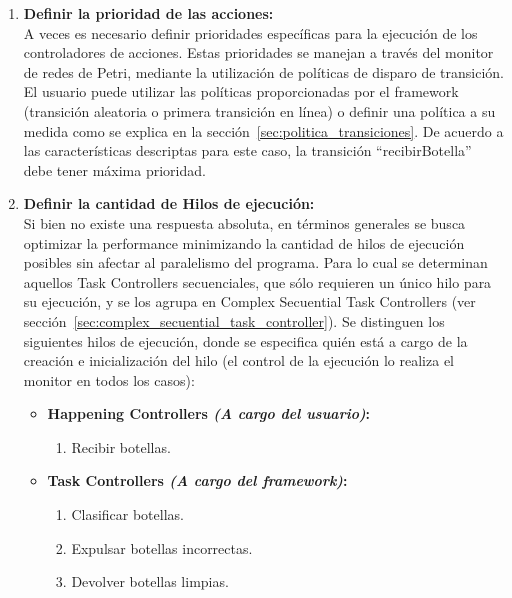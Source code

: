 \begin{enumerate}
\item \textbf{Definir la prioridad de las acciones:}\\
            A veces es necesario definir prioridades específicas para la ejecución de los
            controladores de acciones. Estas prioridades se manejan a través del monitor
            de redes de Petri, mediante la utilización de políticas de disparo de
            transición. El usuario puede utilizar las políticas proporcionadas por el
            framework (transición aleatoria o primera transición en línea) o definir una
            política a su medida como se explica en la sección~\ref{sec:politica_transiciones}.
            De acuerdo a las características descriptas para este caso, la transición
            ``recibirBotella'' debe tener máxima prioridad.

\item \textbf{Definir la cantidad de Hilos de ejecución:}\\
            Si bien no existe una respuesta absoluta, en términos generales se busca
            optimizar la performance minimizando la cantidad de hilos de ejecución
            posibles sin afectar al paralelismo del programa. Para lo cual se determinan
            aquellos Task Controllers secuenciales, que sólo requieren un único hilo para
            su ejecución, y se los agrupa en Complex Secuential Task Controllers (ver
            sección~\ref{sec:complex_secuential_task_controller}).
            Se distinguen los siguientes hilos de ejecución, donde se especifica quién
            está a cargo de la creación e inicialización del hilo (el control de la
            ejecución lo realiza el monitor en todos los casos):
            \begin{itemize}
              \item \textbf{Happening Controllers \emph{(A cargo del usuario)}:}
                  \begin{enumerate}[label=\fbox{\arabic*}]
                    \item Recibir botellas. 
                  \end{enumerate}
              \item \textbf{Task Controllers \emph{(A cargo del framework)}:}
                  \begin{enumerate}[resume , label=\fbox{\arabic*}]
                  \item Clasificar botellas.
                  \item Expulsar botellas incorrectas.
                  \item Devolver botellas limpias.

\end{enumerate}
\end{itemize}
\end{enumerate}
